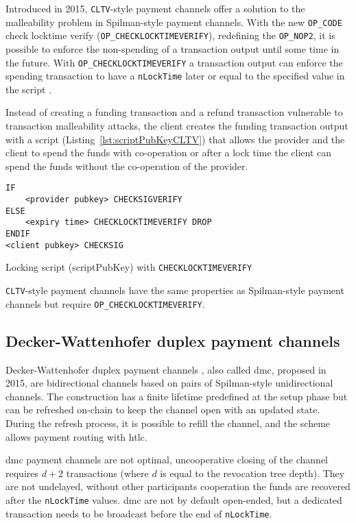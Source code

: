 \documentclass{llncs}
\begin{document}
Introduced in 2015, \texttt{CLTV}-style payment channels offer a solution to the malleability problem in Spilman-style payment channels. With the new \texttt{OP\_CODE} check locktime verify (\texttt{OP\_CHECKLOCKTIMEVERIFY}), redefining the \texttt{OP\_NOP2}, it is possible to enforce the non-spending of a transaction output until some time in the future. With \texttt{OP\_CHECKLOCKTIMEVERIFY} a transaction output can enforce the spending transaction to have a \texttt{nLockTime} later or equal to the specified value in the script \cite{BIP65}.

Instead of creating a funding transaction and a refund transaction vulnerable to transaction malleability attacks, the client creates the funding transaction output with a script (Listing~\ref{lst:scriptPubKeyCLTV}) that allows the provider and the client to spend the funds with co-operation or after a lock time the client can spend the funds without the co-operation of the provider.

\begin{listing}[ht]
  \begin{verbatim}
IF
    <provider pubkey> CHECKSIGVERIFY
ELSE
    <expiry time> CHECKLOCKTIMEVERIFY DROP
ENDIF
<client pubkey> CHECKSIG
  \end{verbatim}
  \caption{Locking script (scriptPubKey) with \texttt{CHECKLOCKTIMEVERIFY}}
  \label{lst:scriptPubKeyCLTV}
\end{listing}

\texttt{CLTV}-style payment channels have the same properties as Spilman-style payment channels but require \texttt{OP\_CHECKLOCKTIMEVERIFY}.

\subsection{Decker-Wattenhofer duplex payment channels}

Decker-Wattenhofer duplex payment channels \cite{Decker2015fast}, also called \gls{dmc}, proposed in 2015, are bidirectional channels based on pairs of Spilman-style unidirectional channels. The construction has a finite lifetime predefined at the setup phase but can be refreshed on-chain to keep the channel open with an updated state. During the refresh process, it is possible to refill the channel, and the scheme allows payment routing with \gls{htlc}.

\gls{dmc} payment channels are not optimal, uncooperative closing of the channel requires $d + 2$ transactions (where $d$ is equal to the revocation tree depth).  They are not undelayed, without other participants cooperation the funds are recovered after the \texttt{nLockTime} values. \gls{dmc} are not by default open-ended, but a dedicated transaction needs to be broadcast before the end of \texttt{nLockTime}.
\end{document}
